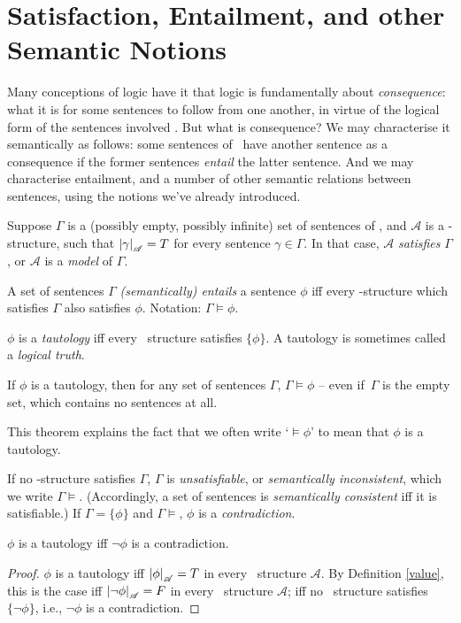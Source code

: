 \section{Satisfaction, Entailment, and other Semantic Notions}

Many conceptions of logic have it that logic is fundamentally about \emph{consequence}: what it is for some sentences to follow from one another, in virtue of the logical form of the sentences involved \citep{brlc}. But what is consequence? We may characterise it semantically as follows: some sentences of \lone\ have another sentence as a consequence if the former sentences \emph{entail} the latter sentence. And we may characterise entailment, and a number of other semantic relations between sentences, using the notions we've already introduced.
\begin{definition}[Satisfaction]
	Suppose $\Gamma$ is a (possibly empty, possibly infinite) set of sentences of \lone, and $\mathscr{A}$ is a \lone-structure, such that $\left|\gamma\right|_{\mathscr{A}}=T$ for every sentence $\gamma\in\Gamma$. In that case, $\mathscr{A}$ \emph{satisfies} $\Gamma$, or $\mathscr{A}$ is a \emph{model} of $\Gamma$.	
	\end{definition}
\begin{definition}[Entailment]
	A set of sentences $\Gamma$ \emph{(semantically) entails} a sentence $\phi$ iff every \lone-structure which satisfies $\Gamma$ also satisfies $\phi$. Notation: $\Gamma \vDash \phi$.
\end{definition}
\begin{definition}[Tautology]		
	$\phi$ is a \emph{tautology} iff every \lone\ structure satisfies $\{\phi\}$. A tautology is sometimes called a \emph{logical truth}. 
\end{definition}
\begin{theorem}
	If $\phi$ is a tautology, then for any set of sentences $\Gamma$, $\Gamma \vDash \phi$ – even if \,$\Gamma$ is the empty set, which contains no sentences at all.
\end{theorem}
This theorem explains the fact that we often write `$\vDash \phi$' to mean that $\phi$ is a tautology.

If no \lone-structure satisfies $\Gamma$,  $\Gamma$ is \emph{unsatisfiable}, or \emph{semantically inconsistent}, which we write $\Gamma\vDash$. (Accordingly, a set of sentences is \emph{semantically consistent} iff it is satisfiable.) If $\Gamma = \{\phi\}$ and $\Gamma \vDash$,  $\phi$ is a \emph{contradiction}.
\begin{theorem}
	$\phi$ is a tautology iff $\neg\phi$ is a contradiction.
	\begin{proof}
		$\phi$ is a tautology iff $\left|\phi\right|_{\mathscr{A}} =T$ in every \lone\ structure $\mathscr{A}$. By Definition \ref{value}, this is the case iff $\left|\neg\phi\right|_{\mathscr{A}}=F$ in every \lone\ structure $\mathscr{A}$; iff no \lone\ structure satisfies $\{\neg\phi\}$, i.e., $\neg\phi$ is a contradiction. 
	\end{proof}
\end{theorem}


